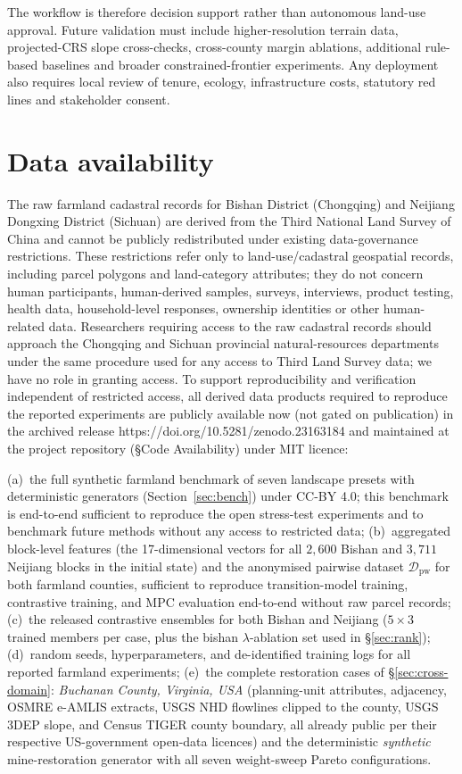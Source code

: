 \documentclass[11pt]{article}
\begin{document}
The workflow is therefore decision support rather than autonomous land-use approval. Future validation must include higher-resolution terrain data, projected-CRS slope cross-checks, cross-county margin ablations, additional rule-based baselines and broader constrained-frontier experiments. Any deployment also requires local review of tenure, ecology, infrastructure costs, statutory red lines and stakeholder consent.

\section*{Data availability}
The raw farmland cadastral records for Bishan District (Chongqing) and Neijiang Dongxing District (Sichuan) are derived from the Third National Land Survey of China and cannot be publicly redistributed under existing data-governance restrictions. These restrictions refer only to land-use/cadastral geospatial records, including parcel polygons and land-category attributes; they do not concern human participants, human-derived samples, surveys, interviews, product testing, health data, household-level responses, ownership identities or other human-related data. Researchers requiring access to the raw cadastral records should approach the Chongqing and Sichuan provincial natural-resources departments under the same procedure used for any access to Third Land Survey data; we have no role in granting access. To support reproducibility and verification independent of restricted access, all derived data products required to reproduce the reported experiments are publicly available now (not gated on publication) in the archived release https://doi.org/10.5281/zenodo.23163184 and maintained at the project repository (\S Code Availability) under MIT licence:

(a)~the full synthetic farmland benchmark of seven landscape presets with deterministic generators (Section~\ref{sec:bench}) under CC-BY 4.0; this benchmark is end-to-end sufficient to reproduce the open stress-test experiments and to benchmark future methods without any access to restricted data;
(b)~aggregated block-level features (the 17-dimensional vectors for all $2{,}600$ Bishan and $3{,}711$ Neijiang blocks in the initial state) and the anonymised pairwise dataset $\mathcal{D}_{\text{pw}}$ for both farmland counties, sufficient to reproduce transition-model training, contrastive training, and MPC evaluation end-to-end without raw parcel records;
(c)~the released contrastive ensembles for both Bishan and Neijiang ($5 \times 3$ trained members per case, plus the bishan $\lambda$-ablation set used in \S\ref{sec:rank});
(d)~random seeds, hyperparameters, and de-identified training logs for all reported farmland experiments;
(e)~the complete restoration cases of \S\ref{sec:cross-domain}: \emph{Buchanan County, Virginia, USA} (planning-unit attributes, adjacency, OSMRE e-AMLIS extracts, USGS NHD flowlines clipped to the county, USGS 3DEP slope, and Census TIGER county boundary, all already public per their respective US-government open-data licences) and the deterministic \emph{synthetic} mine-restoration generator with all seven weight-sweep Pareto configurations.
\end{document}
